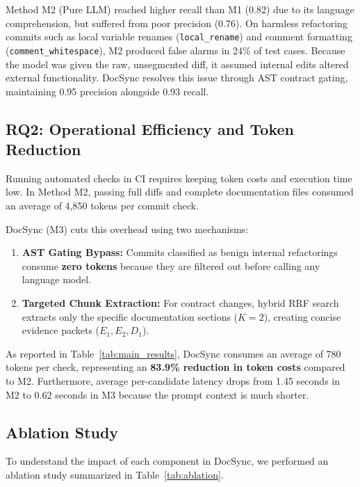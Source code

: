 \documentclass[12pt,onecolumn,draftclsnofoot]{IEEEtran}
\begin{document}
Method M2 (Pure LLM) reached higher recall than M1 (0.82) due to its language comprehension, but suffered from poor precision (0.76). On harmless refactoring commits such as local variable renames (\texttt{local\_rename}) and comment formatting (\texttt{comment\_whitespace}), M2 produced false alarms in 24\% of test cases. Because the model was given the raw, unsegmented diff, it assumed internal edits altered external functionality. DocSync resolves this issue through AST contract gating, maintaining 0.95 precision alongside 0.93 recall.

\subsection{RQ2: Operational Efficiency and Token Reduction}
Running automated checks in CI requires keeping token costs and execution time low. In Method M2, passing full diffs and complete documentation files consumed an average of 4,850 tokens per commit check.

DocSync (M3) cuts this overhead using two mechanisms:
\begin{enumerate}
    \item \textbf{AST Gating Bypass:} Commits classified as benign internal refactorings consume \textbf{zero tokens} because they are filtered out before calling any language model.
    \item \textbf{Targeted Chunk Extraction:} For contract changes, hybrid RRF search extracts only the specific documentation sections ($K=2$), creating concise evidence packets ($E_1, E_2, D_1$).
\end{enumerate}
As reported in Table~\ref{tab:main_results}, DocSync consumes an average of 780 tokens per check, representing an \textbf{83.9\% reduction in token costs} compared to M2. Furthermore, average per-candidate latency drops from 1.45 seconds in M2 to 0.62 seconds in M3 because the prompt context is much shorter.

\subsection{Ablation Study}
To understand the impact of each component in DocSync, we performed an ablation study summarized in Table~\ref{tab:ablation}.
\end{document}
